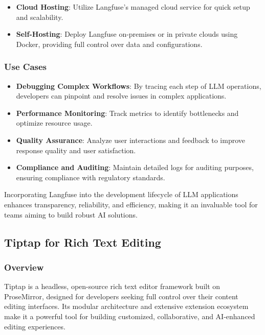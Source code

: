 \begin{itemize}
    \item \textbf{Cloud Hosting}: Utilize Langfuse’s managed cloud service for quick setup and scalability.
    \item \textbf{Self-Hosting}: Deploy Langfuse on-premises or in private clouds using Docker, providing full control over data and configurations.
\end{itemize}

\subsubsection{Use Cases}
\begin{itemize}
    \item \textbf{Debugging Complex Workflows}: By tracing each step of LLM operations, developers can pinpoint and resolve issues in complex applications.
    \item \textbf{Performance Monitoring}: Track metrics to identify bottlenecks and optimize resource usage.
    \item \textbf{Quality Assurance}: Analyze user interactions and feedback to improve response quality and user satisfaction.
    \item \textbf{Compliance and Auditing}: Maintain detailed logs for auditing purposes, ensuring compliance with regulatory standards.
\end{itemize}

Incorporating Langfuse into the development lifecycle of LLM applications enhances transparency, reliability, and efficiency, making it an invaluable tool for teams aiming to build robust AI solutions.

\subsection{Tiptap for Rich Text Editing}

\subsubsection{Overview}
Tiptap is a headless, open-source rich text editor framework built on ProseMirror, designed for developers seeking full control over their content editing interfaces. Its modular architecture and extensive extension ecosystem make it a powerful tool for building customized, collaborative, and AI-enhanced editing experiences.

